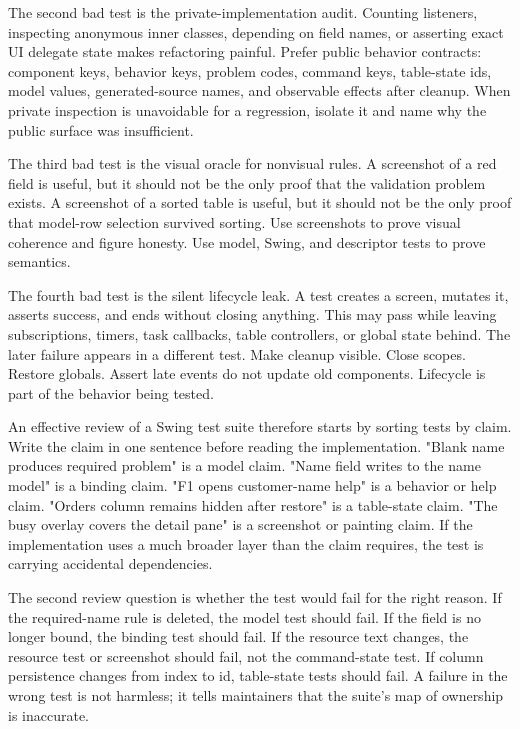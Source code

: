 The second bad test is the private-implementation audit. Counting listeners, inspecting anonymous inner classes, depending on field names, or asserting exact UI delegate state makes refactoring painful. Prefer public behavior contracts: component keys, behavior keys, problem codes, command keys, table-state ids, model values, generated-source names, and observable effects after cleanup. When private inspection is unavoidable for a regression, isolate it and name why the public surface was insufficient.

The third bad test is the visual oracle for nonvisual rules. A screenshot of a red field is useful, but it should not be the only proof that the validation problem exists. A screenshot of a sorted table is useful, but it should not be the only proof that model-row selection survived sorting. Use screenshots to prove visual coherence and figure honesty. Use model, Swing, and descriptor tests to prove semantics.

The fourth bad test is the silent lifecycle leak. A test creates a screen, mutates it, asserts success, and ends without closing anything. This may pass while leaving subscriptions, timers, task callbacks, table controllers, or global state behind. The later failure appears in a different test. Make cleanup visible. Close scopes. Restore globals. Assert late events do not update old components. Lifecycle is part of the behavior being tested.

An effective review of a Swing test suite therefore starts by sorting tests by claim. Write the claim in one sentence before reading the implementation. "Blank name produces required problem" is a model claim. "Name field writes to the name model" is a binding claim. "F1 opens customer-name help" is a behavior or help claim. "Orders column remains hidden after restore" is a table-state claim. "The busy overlay covers the detail pane" is a screenshot or painting claim. If the implementation uses a much broader layer than the claim requires, the test is carrying accidental dependencies.

The second review question is whether the test would fail for the right reason. If the required-name rule is deleted, the model test should fail. If the field is no longer bound, the binding test should fail. If the resource text changes, the resource test or screenshot should fail, not the command-state test. If column persistence changes from index to id, table-state tests should fail. A failure in the wrong test is not harmless; it tells maintainers that the suite's map of ownership is inaccurate.

